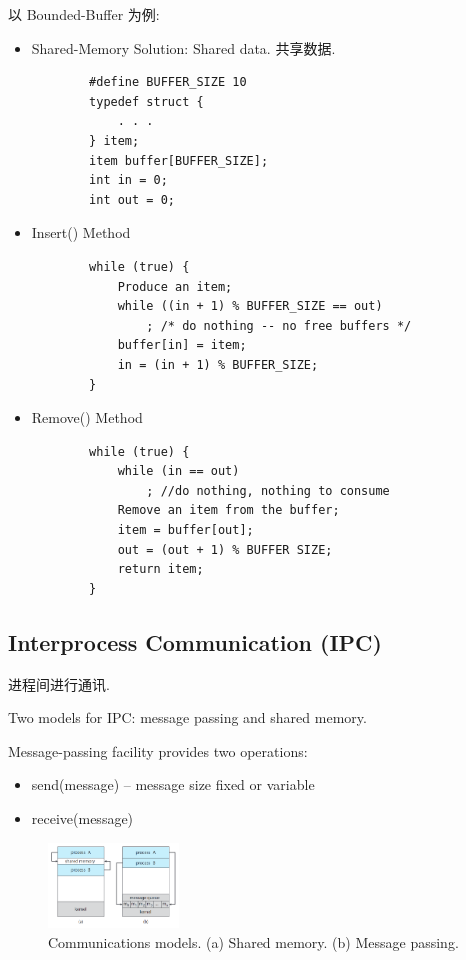 以 Bounded-Buffer 为例:
\begin{itemize}
    \item Shared-Memory Solution: Shared data. 共享数据. 
    \begin{verbatim}
        #define BUFFER_SIZE 10
        typedef struct {
            . . .
        } item;
        item buffer[BUFFER_SIZE];
        int in = 0;
        int out = 0;
    \end{verbatim}
    \item Insert() Method
    \begin{verbatim}
        while (true) {
            Produce an item;
            while ((in + 1) % BUFFER_SIZE == out) 
                ; /* do nothing -- no free buffers */
            buffer[in] = item;
            in = (in + 1) % BUFFER_SIZE;
        }
    \end{verbatim}
    \item Remove() Method
    \begin{verbatim}
        while (true) {
            while (in == out)
                ; //do nothing, nothing to consume
            Remove an item from the buffer;
            item = buffer[out];
            out = (out + 1) % BUFFER SIZE;
            return item;
        }
    \end{verbatim}
\end{itemize}

\subsection{Interprocess Communication (IPC)}
进程间进行通讯. 

Two models for IPC: message passing and shared memory. 

Message-passing facility provides two operations:
\begin{itemize}
    \item send(message) – message size fixed or variable
    \item receive(message)
\end{itemize}

\begin{figure}[!htb]
    \centering
    \includegraphics[width=0.309\textwidth]{pic/OS3/Communications models}
    \caption{Communications models. (a) Shared memory. (b) Message passing.}
\end{figure}

